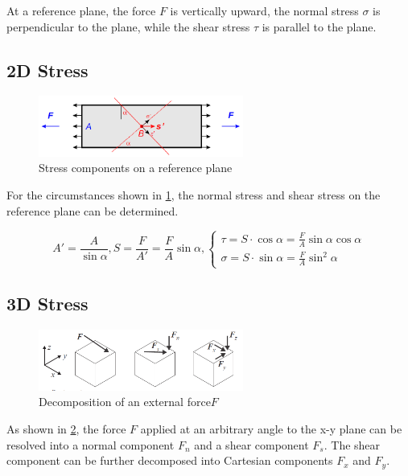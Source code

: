 \documentclass[en,hazy,cyan,8pt,normal]{elegantnote}
\numberwithin{equation}{section}
\begin{document}
    At a reference plane, the force $F$ is vertically upward, the normal stress $\sigma$ is perpendicular to the plane, while the shear stress $\tau$ is parallel to the plane.

  \subsection{2D Stress}
    \begin{figure}[H]
      \centering
      \includegraphics[width=0.6\textwidth]{image/001.png}
      \caption{Stress components on a reference plane}
      \label{fig:001}
    \end{figure}

    For the circumstances shown in \cref{fig:001}, the normal stress and shear stress on the reference plane can be determined.

    \begin{equation}\label{eq:002}
      A'=\frac{A}{\sin \alpha}, S=\frac{F}{A'}=\frac{F}{A} \sin \alpha,
      \begin{cases}
        \tau=S\cdot\cos\alpha=\frac{F}{A} \sin \alpha \cos \alpha\\
        \sigma=S\cdot\sin\alpha=\frac{F}{A} \sin^2 \alpha
      \end{cases}
    \end{equation}

  \subsection{3D Stress}
    \begin{figure}[H]
      \centering
      \includegraphics[width=0.6\textwidth]{image/002.png}
      \caption{Decomposition of an external force$F$}
      \label{fig:002}
    \end{figure}

    As shown in \cref{fig:002}, the force $F$ applied at an arbitrary angle to the x-y plane can be resolved into a normal component $F_n$ and a shear component $F_s$. The shear component can be further decomposed into Cartesian components $F_x$ and $F_y$.
\end{document}
